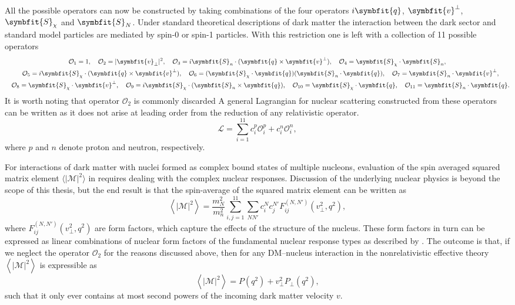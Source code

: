 \documentclass[b5paper, 10pt, twoside]{book}
\renewcommand{\vec}[1]{\symbfit{#1}}
\newcommand{\mean}[1]{\left\langle#1\right\rangle}
\newcommand{\tmean}[1]{\langle#1\rangle}
\begin{document}
All the possible operators can now be constructed by taking combinations of the four operators $i\vec{q}$, $\vec{v}^\perp$, $\vec{S}_\chi$ and $\vec{S}_N$. Under standard theoretical descriptions of dark matter the interaction between the dark sector and standard model particles are mediated by spin-0 or spin-1 particles. With this restriction one is left with a collection of 11 possible operators
\begin{gather*}
    \mathcal{O}_1=1,\quad\mathcal{O}_2=|\vec{v}_\perp|^2,\quad\mathcal{O}_3=i\vec{S}_n\cdot(\vec{q}\times\vec{v}^\perp),\quad\mathcal{O}_4=\vec{S}_\chi\cdot\vec{S}_n,\\
    \quad\mathcal{O}_5=i\vec{S}_\chi\cdot(\vec{q}\times\vec{v}^\perp),\quad\mathcal{O}_6=(\vec{S}_\chi\cdot\vec{q})(\vec{S}_n\cdot\vec{q}),\quad\mathcal{O}_7=\vec{S}_n\cdot\vec{v}^\perp,\\
    \quad\mathcal{O}_8=\vec{S}_\chi\cdot\vec{v}^\perp,\quad\mathcal{O}_9=i\vec{S}_\chi\cdot(\vec{S}_n\times\vec{q}),\quad\mathcal{O}_{10}=\vec{S}_\chi\cdot\vec{q},\quad\mathcal{O}_{11}=\vec{S}_n\cdot\vec{q}.
\end{gather*}
It is worth noting that operator $\mathcal{O}_2$ is commonly discarded A general Lagrangian for nuclear scattering constructed from these operators can be written as it does not arise at leading order from the reduction of any relativistic operator.
\begin{equation}
    \mathcal{L}=\sum_{i=1}^{11}c_i^p\mathcal{O}_i^p+c_i^n\mathcal{O}_i^n,
\end{equation}
where $p$ and $n$ denote proton and neutron, respectively.

For interactions of dark matter with nuclei formed as complex bound states of multiple nucleons, evaluation of the spin averaged squared matrix element $\tmean{|\mathcal{M}|^2}$ in requires dealing with the complex nuclear responses. Discussion of the underlying nuclear physics is beyond the scope of this thesis, but the end result is that the spin-average of the squared matrix element can be written as
\begin{equation}
    \mean{|\mathcal{M}|^2}=\frac{m_N^2}{m_n^2}\sum_{i,j=1}^{11}\sum_{NN'}c_i^Nc_j^{N'}F_{ij}^{(N,N')}(v_\perp^2,q^2),
\end{equation}
where $F_{ij}^{(N,N')}(v_\perp^2,q^2)$ are form factors, which capture the effects of the structure of the nucleus. These form factors in turn can be expressed as linear combinations of nuclear form factors of the fundamental nuclear response types as described by \textcite{FitzpatrickEtAl2013}. The outcome is that, if we neglect the operator $\mathcal{O}_2$ for the reasons discussed above, then for any DM--nucleus interaction in the nonrelativistic effective theory $\mean{|\mathcal{M}|^2}$ is expressible as
\begin{equation}
    \mean{|\mathcal{M}|^2}=P(q^2)+v_\perp^2P_\perp(q^2),
    \label{eq:eft-amplitude-square}
\end{equation}
such that it only ever contains at most second powers of the incoming dark matter velocity $v$.
\end{document}

